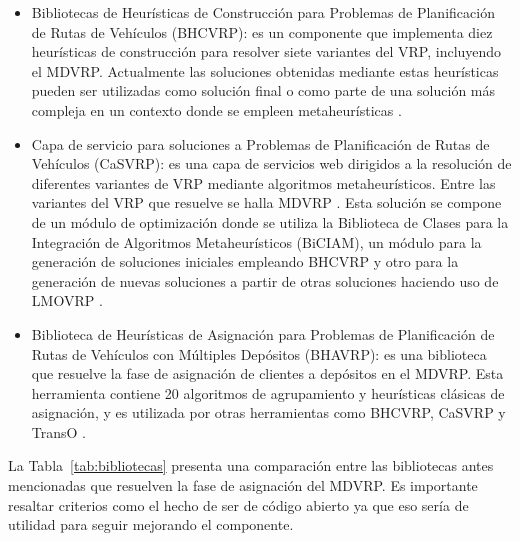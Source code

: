 \begin{itemize}
  \item Bibliotecas de Heurísticas de Construcción para Problemas de Planificación de Rutas de Vehículos (BHCVRP): es un componente que implementa diez heurísticas de construcción para resolver siete variantes del VRP, incluyendo el MDVRP. Actualmente las soluciones obtenidas mediante estas heurísticas pueden ser utilizadas como solución final o como parte de una solución más compleja en un contexto donde se empleen metaheurísticas \parencite{anandadelacaridadmoralesmoralesNuevaVersionBiblioteca2025}.
  \item Capa de servicio para soluciones a Problemas de Planificación de Rutas de Vehículos (CaSVRP): es una capa de servicios web dirigidos a la resolución de diferentes variantes de VRP mediante algoritmos metaheurísticos. Entre las variantes del VRP que resuelve se halla MDVRP \parencite{g.yanezDesarrolloNuevosModelos2021}. Esta solución se compone de un módulo de optimización donde se utiliza la Biblioteca de Clases para la Integración de Algoritmos Metaheurísticos (BiCIAM)\parencite{hernandezNuevaVersionBiblioteca2014a}, un módulo para la generación de soluciones iniciales empleando BHCVRP y otro para la generación de nuevas soluciones a partir de otras soluciones haciendo uso de LMOVRP \parencite{loresOperadoresMutacionBasados2017}.
  \item Biblioteca de Heurísticas de Asignación para Problemas de Planificación de Rutas de Vehículos con Múltiples Depósitos (BHAVRP): es una biblioteca que resuelve la fase de asignación de clientes a depósitos en el MDVRP. Esta herramienta contiene 20 algoritmos de agrupamiento y heurísticas clásicas de asignación, y es utilizada por otras herramientas como BHCVRP, CaSVRP y TransO \parencite{ericramosaragonIncorporacionModuloMetricas2025}.
\end{itemize}

La Tabla~\ref{tab:bibliotecas} presenta una comparación entre las bibliotecas antes mencionadas que resuelven la fase de asignación del MDVRP. Es importante resaltar criterios como el hecho de ser de código abierto ya que eso sería de utilidad para seguir mejorando el componente.

